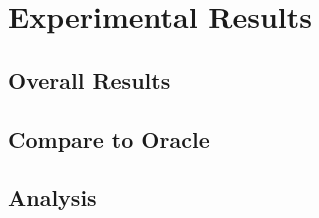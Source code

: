 \section{Experimental Results}


\subsection{Overall Results\label{sec:overall_result}}



\subsection{Compare to Oracle}


\subsection{Analysis}
